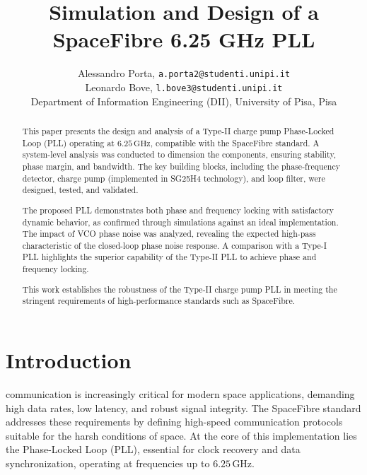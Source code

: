 \documentclass[lettersize,journal]{IEEEtran}
\begin{document}
\title{Simulation and Design of a SpaceFibre 6.25 GHz PLL}

\author{Alessandro Porta, \texttt{a.porta2@studenti.unipi.it}\\
Leonardo Bove, \texttt{l.bove3@studenti.unipi.it}\\
Department of Information Engineering (DII), University of Pisa, Pisa}


\maketitle

\begin{abstract}
This paper presents the design and analysis of a Type-II charge pump Phase-Locked Loop (PLL) operating at \(6.25 \, \text{GHz}\), compatible with the SpaceFibre standard. A system-level analysis was conducted to dimension the components, ensuring stability, phase margin, and bandwidth. The key building blocks, including the phase-frequency detector, charge pump (implemented in SG25H4 technology), and loop filter, were designed, tested, and validated.

The proposed PLL demonstrates both phase and frequency locking with satisfactory dynamic behavior, as confirmed through simulations against an ideal implementation. The impact of VCO phase noise was analyzed, revealing the expected high-pass characteristic of the closed-loop phase noise response. A comparison with a Type-I PLL highlights the superior capability of the Type-II PLL to achieve phase and frequency locking.

This work establishes the robustness of the Type-II charge pump PLL in meeting the stringent requirements of high-performance standards such as SpaceFibre.
\end{abstract}

\section{Introduction}
 communication is increasingly critical for modern space applications, demanding high data rates, low latency, and robust signal integrity. The SpaceFibre standard addresses these requirements by defining high-speed communication protocols suitable for the harsh conditions of space. At the core of this implementation lies the Phase-Locked Loop (PLL), essential for clock recovery and data synchronization, operating at frequencies up to \(6.25 \, \text{GHz}\). 
\end{document}
